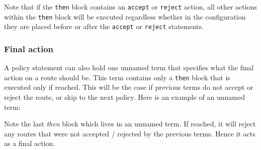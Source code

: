 Note that if the {\tt then} block contains an {\tt accept} or {\tt reject}
action, all other actions within the {\tt then} block will be executed
regardless whether in the configuration they are placed before or after
the {\tt accept} or {\tt reject} statements.

\subsubsection{Final action}
A policy statement can also hold one unnamed term that specifies what the
final action on a route should be.  This term contains only a {\tt then}
block that is executed only if reached.  This will be the case if previous terms
do not accept or reject the route, or skip to the next policy.  Here is an
example of an unnamed term:

\noindent{}

Note the last {\em then} block which lives in an unnamed term.  If reached, it
will reject any routes that were not accepted / rejected by the previous terms.
Hence it acts as a final action.

